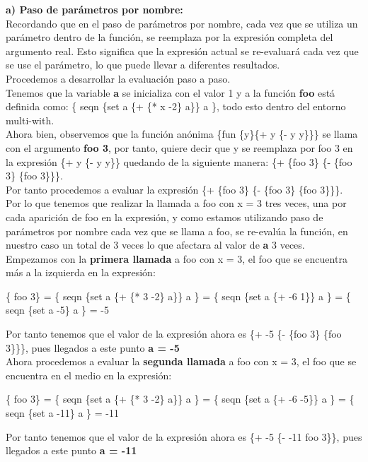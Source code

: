 \documentclass[11pt]{article}
\begin{document}
\begin{enumerate}[leftmargin=0.8cm]
    \textbf{a) Paso de parámetros por nombre:}\\
    Recordando que en el paso de parámetros por nombre, cada vez que se utiliza un parámetro dentro de la función, se reemplaza por la expresión completa del argumento real. Esto significa que la expresión actual se re-evaluará cada vez que se use el parámetro, lo que puede llevar a diferentes resultados.\\
    Procedemos a desarrollar la evaluación paso a paso.\\
    Tenemos que la variable \textbf{a} se inicializa con el valor 1 y a la función \textbf{foo} está definida como: \{ seqn \{set a \{+ \{* x -2\} a\}\} a \}, todo esto dentro del entorno multi-with.\\
    Ahora bien, observemos que la función anónima \{fun \{y\}\{+ y \{- y y\}\}\} se llama con el argumento \textbf{foo 3}, por tanto, quiere decir que y se reemplaza por foo 3 en la expresión \{+ y \{- y y\}\} quedando de la siguiente manera: \{+ \{foo 3\} \{- \{foo 3\} \{foo 3\}\}\}.\\
    Por tanto procedemos a evaluar la expresión \{+ \{foo 3\} \{- \{foo 3\} \{foo 3\}\}\}.\\
    Por lo que tenemos que realizar la llamada a foo con x = 3 tres veces, una por cada aparición de foo en la expresión, y como estamos utilizando paso de parámetros por nombre cada vez que se llama a foo, se re-evalúa la función, en nuestro caso un total de 3 veces lo que afectara al valor de \textbf{a} 3 veces.\\
    Empezamos con la \textbf{primera llamada} a foo con x = 3, el foo que se encuentra más a la izquierda en la expresión: 
    \begin{center}
        \{ foo 3\} = \{ seqn \{set a \{+ \{* 3 -2\} a\}\} a \} = \{ seqn \{set a \{+ -6 1\}\} a \} = \{ seqn \{set a -5\} a \} = -5
    \end{center}
    Por tanto tenemos que el valor de la expresión ahora es \{+ -5 \{- \{foo 3\} \{foo 3\}\}\}, pues llegados a este punto \textbf{a = -5} \\

    Ahora procedemos a evaluar la \textbf{segunda llamada} a foo con x = 3, el foo que se encuentra en el medio en la expresión:
    \begin{center}
        \{ foo 3\} = \{ seqn \{set a \{+ \{* 3 -2\} a\}\} a \} = \{ seqn \{set a \{+ -6 -5\}\} a \} = \{ seqn \{set a -11\} a \} = -11
    \end{center}
    Por tanto tenemos que el valor de la expresión ahora es \{+ -5 \{- -11 {foo 3}\}\}, pues llegados a este punto \textbf{a = -11} \\


\end{enumerate}
\end{document}
